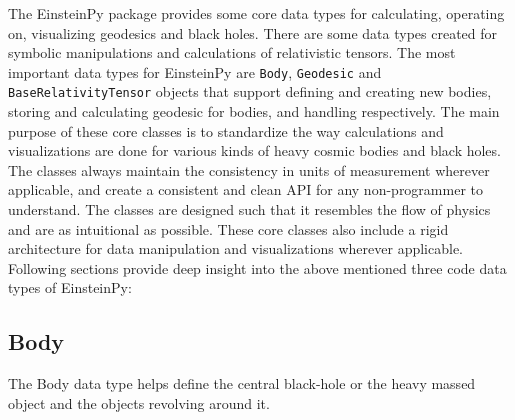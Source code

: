 \documentclass{aastex63}
\begin{document}
The EinsteinPy package provides some core data types for calculating, operating on, visualizing geodesics and black holes. There are some data types created for symbolic manipulations and calculations of relativistic tensors. The most important data types for EinsteinPy are \texttt{Body}, \texttt{Geodesic} and \texttt{BaseRelativityTensor} objects that support defining and creating new bodies, storing and calculating geodesic for bodies, and handling respectively. The main purpose of these core classes is to standardize the way calculations and visualizations are done for various kinds of heavy cosmic bodies and black holes. The classes always maintain the consistency in units of measurement wherever applicable, and create a consistent and clean API for any non-programmer to understand. The classes are designed such that it resembles the flow of physics and are  as intuitional as possible. These core classes also include a rigid architecture for data manipulation and visualizations wherever applicable. Following sections provide deep insight into the above mentioned three code data types of EinsteinPy:

\subsection{Body} \label{subsec:Body}
The Body data type helps define the central black-hole or the heavy massed object and the objects revolving around it. 

\end{document}
